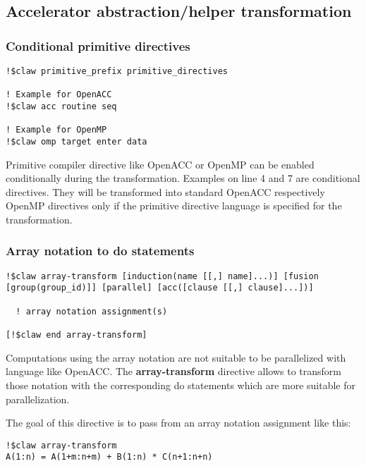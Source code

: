 \subsection{Accelerator abstraction/helper transformation}

\subsubsection{Conditional primitive directives}
\begin{lstlisting}
!$claw primitive_prefix primitive_directives

! Example for OpenACC
!$claw acc routine seq

! Example for OpenMP
!$claw omp target enter data
\end{lstlisting}

Primitive compiler directive like OpenACC or OpenMP can be enabled conditionally during the transformation. Examples on line 4 and 7 are conditional directives. They will be transformed into standard OpenACC respectively OpenMP directives only if the primitive directive language is specified for the transformation.

\subsubsection{Array notation to do statements}
\begin{lstlisting}
!$claw array-transform [induction(name [[,] name]...)] [fusion [group(group_id)]] [parallel] [acc([clause [[,] clause]...])]

  ! array notation assignment(s) 
  
[!$claw end array-transform]
\end{lstlisting}

Computations using the array notation are not suitable to be parallelized with
language like OpenACC. The \textbf{array-transform} directive allows to transform those
notation with the corresponding do statements which are more suitable for
parallelization.

The goal of this directive is to pass from an array notation assignment like
this:

\begin{lstlisting}
!$claw array-transform
A(1:n) = A(1+m:n+m) + B(1:n) * C(n+1:n+n)
\end{lstlisting}

